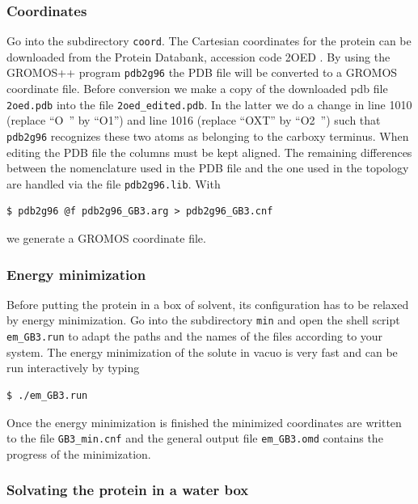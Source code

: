 \subsubsection{Coordinates}

Go into the subdirectory \texttt{coord}. The Cartesian coordinates for the protein can be downloaded from the Protein Databank, accession code 2OED \cite{Ulmer_2003}. By using the GROMOS++ program \texttt{pdb2g96} the PDB file will be converted to a GROMOS coordinate file. Before conversion we make a copy of the downloaded pdb file \texttt{2oed.pdb} into the file \texttt{2oed\_edited.pdb}. In the latter we do a change in line 1010 (replace “O~” by “O1”) and line 1016 (replace “OXT” by “O2~”) such that \texttt{pdb2g96} recognizes these two atoms as belonging to the carboxy terminus. When editing the PDB file the columns must be kept aligned. The remaining differences between the nomenclature used in the PDB file and the one used in the topology are handled via the file \texttt{pdb2g96.lib}. With
\begin{lstlisting}
$ pdb2g96 @f pdb2g96_GB3.arg > pdb2g96_GB3.cnf
\end{lstlisting}
we generate a GROMOS coordinate file. 

\subsubsection{Energy minimization}

Before putting the protein in a box of solvent, its configuration has to be relaxed by energy minimization. Go into the subdirectory \texttt{min} and open the shell script \texttt{em\_GB3.run} to adapt the paths and the names of the files according to your system. The energy minimization of the solute in vacuo is very fast and can be run interactively by typing
\begin{lstlisting}
$ ./em_GB3.run
\end{lstlisting}
Once the energy minimization is finished the minimized coordinates are written to the file \texttt{GB3\_min.cnf} and the general output file \texttt{em\_GB3.omd} contains the progress of the minimization.

\subsubsection{Solvating the protein in a water box}

